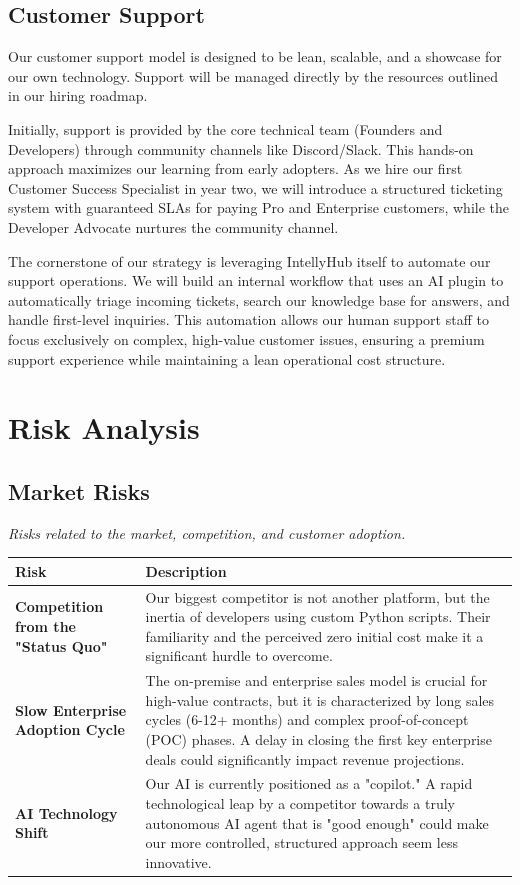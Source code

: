 \documentclass[11pt, a4paper, oneside]{article}
\begin{document}
\subsection{Customer Support}
Our customer support model is designed to be lean, scalable, and a showcase for our own technology. Support will be managed directly by the resources outlined in our hiring roadmap.

Initially, support is provided by the core technical team (Founders and Developers) through community channels like Discord/Slack. This hands-on approach maximizes our learning from early adopters. As we hire our first Customer Success Specialist in year two, we will introduce a structured ticketing system with guaranteed SLAs for paying Pro and Enterprise customers, while the Developer Advocate nurtures the community channel.

The cornerstone of our strategy is leveraging IntellyHub itself to automate our support operations. We will build an internal workflow that uses an AI plugin to automatically triage incoming tickets, search our knowledge base for answers, and handle first-level inquiries. This automation allows our human support staff to focus exclusively on complex, high-value customer issues, ensuring a premium support experience while maintaining a lean operational cost structure.


\section{Risk Analysis}
\subsection{Market Risks}
\textit{Risks related to the market, competition, and customer adoption.}

\begin{table}[H]
\centering
\begin{tabularx}{\textwidth}{@{}lL@{}}
\toprule
\textbf{Risk} & \textbf{Description} \\
\midrule
\textbf{Competition from the "Status Quo"} & Our biggest competitor is not another platform, but the inertia of developers using custom Python scripts. Their familiarity and the perceived zero initial cost make it a significant hurdle to overcome. \\
\addlinespace
\textbf{Slow Enterprise Adoption Cycle} & The on-premise and enterprise sales model is crucial for high-value contracts, but it is characterized by long sales cycles (6-12+ months) and complex proof-of-concept (POC) phases. A delay in closing the first key enterprise deals could significantly impact revenue projections. \\
\addlinespace
\textbf{AI Technology Shift} & Our AI is currently positioned as a "copilot." A rapid technological leap by a competitor towards a truly autonomous AI agent that is "good enough" could make our more controlled, structured approach seem less innovative. \\
\bottomrule
\end{tabularx}
\end{table}
\end{document}
